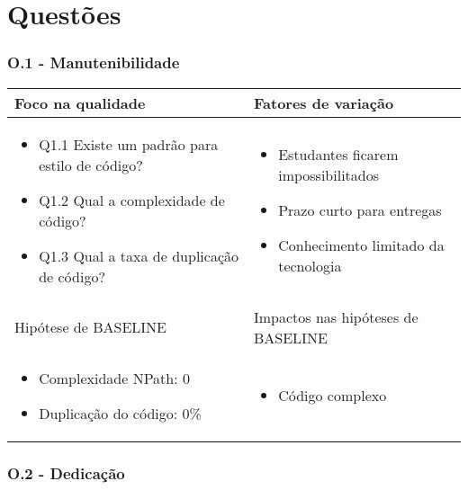 \chapter{Questões}

\subsection{O.1 - Manutenibilidade}

	\begin{tabular}{ |p{6cm}|p{6cm}|  }
	 \hline
	 Foco na qualidade 		& 		Fatores de variação \\
	 \hline
	 \begin{itemize} \item Q1.1 Existe um padrão para estilo de código? \item Q1.2 Qual a complexidade de código? \item Q1.3 Qual a taxa de duplicação de código? \end{itemize} & \begin{itemize} \item Estudantes ficarem impossibilitados \item Prazo curto para entregas 
	 \item Conhecimento limitado da tecnologia \end{itemize}\\
	 \hline
	 Hipótese de BASELINE 		& 		Impactos nas hipóteses de BASELINE \\
	 \hline
	 \begin{itemize} \item Complexidade NPath: 0  \item Duplicação do código: 0\% \end{itemize} & \begin{itemize} \item Código complexo \end{itemize} \\
	 \hline
	\end{tabular}

\subsection{O.2 - Dedicação}

